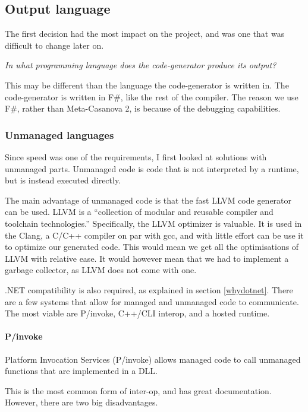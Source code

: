 \subsection{Output language}
The first decision had the most impact on the project, and was one that was difficult to change later on.

\textit{In what programming language does the code-generator produce its output?}

This may be different than the language the code-generator is written in.
The code-generator is written in F\#, like the rest of the compiler.
The reason we use F\#, rather than Meta-Casanova 2, is because of the debugging capabilities.

\subsubsection{Unmanaged languages}
Since speed was one of the requirements, I first looked at solutions with unmanaged parts.
Unmanaged code is code that is not interpreted by a runtime, but is instead executed directly.

The main advantage of unmanaged code is that the fast LLVM code generator can be used.
LLVM is a ``collection of modular and reusable compiler and toolchain technologies.''\cite{llvm}
Specifically, the LLVM optimizer is valuable.
It is used in the Clang, a C/C++ compiler on par with gcc, and with little effort can be use it to optimize our generated code.
This would mean we get all the optimisations of LLVM with relative ease.
It would however mean that we had to implement a garbage collector, as LLVM does not come with one.
 
.NET compatibility is also required, as explained in section \ref{whydotnet}.
There are a few systems that allow for managed and unmanaged code to communicate.
The most viable are P/invoke, C++/CLI interop, and a hosted runtime.

\paragraph{P/invoke}
Platform Invocation Services (P/invoke) allows managed code to call unmanaged functions that are implemented in a DLL.\cite{msdn_pinvoke}

This is the most common form of inter-op, and has great documentation.
However, there are two big disadvantages.

